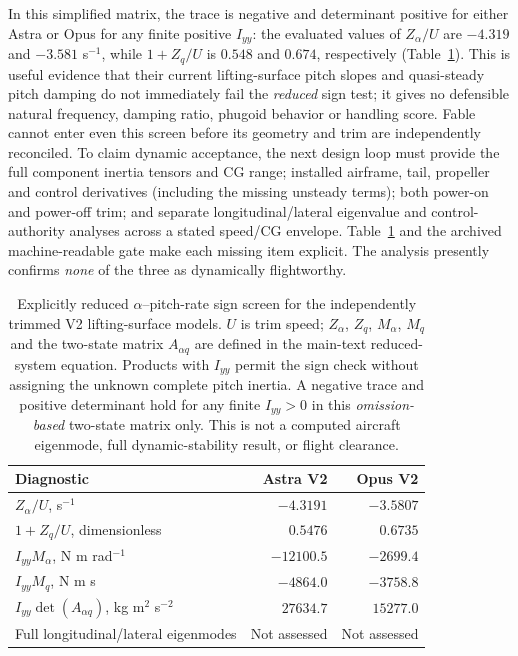 \documentclass[10pt,letterpaper]{article}
\begin{document}
In this simplified matrix, the trace is negative and determinant positive for either Astra or Opus for any finite positive $I_{yy}$: the evaluated values of $Z_\alpha/U$ are $-4.319$ and $-3.581$ s$^{-1}$, while $1+Z_q/U$ is $0.548$ and $0.674$, respectively (Table~\ref{tab:reduceddynamic}). This is useful evidence that their current lifting-surface pitch slopes and quasi-steady pitch damping do not immediately fail the \emph{reduced} sign test; it gives no defensible natural frequency, damping ratio, phugoid behavior or handling score. Fable cannot enter even this screen before its geometry and trim are independently reconciled. To claim dynamic acceptance, the next design loop must provide the full component inertia tensors and CG range; installed airframe, tail, propeller and control derivatives (including the missing unsteady terms); both power-on and power-off trim; and separate longitudinal/lateral eigenvalue and control-authority analyses across a stated speed/CG envelope. Table~\ref{tab:reduceddynamic} and the archived machine-readable gate make each missing item explicit. The analysis presently confirms \emph{none} of the three as dynamically flightworthy.

\begin{table}[H]\centering\footnotesize
\caption{Explicitly reduced $\alpha$--pitch-rate sign screen for the independently trimmed V2 lifting-surface models. $U$ is trim speed; $Z_\alpha$, $Z_q$, $M_\alpha$, $M_q$ and the two-state matrix $A_{\alpha q}$ are defined in the main-text reduced-system equation. Products with $I_{yy}$ permit the sign check without assigning the unknown complete pitch inertia. A negative trace and positive determinant hold for any finite $I_{yy}>0$ in this \emph{omission-based} two-state matrix only. This is not a computed aircraft eigenmode, full dynamic-stability result, or flight clearance.}\label{tab:reduceddynamic}
\begin{tabular}{lrr}\toprule
Diagnostic & Astra V2 & Opus V2\\\midrule
$Z_\alpha/U$, s$^{-1}$ & $-4.3191$ & $-3.5807$\\
$1+Z_q/U$, dimensionless & $0.5476$ & $0.6735$\\
$I_{yy}M_\alpha$, N m rad$^{-1}$ & $-12100.5$ & $-2699.4$\\
$I_{yy}M_q$, N m s & $-4864.0$ & $-3758.8$\\
$I_{yy}\det(A_{\alpha q})$, kg m$^2$ s$^{-2}$ & $27634.7$ & $15277.0$\\
Full longitudinal/lateral eigenmodes & Not assessed & Not assessed\\\bottomrule
\end{tabular}
\end{table}
\end{document}

